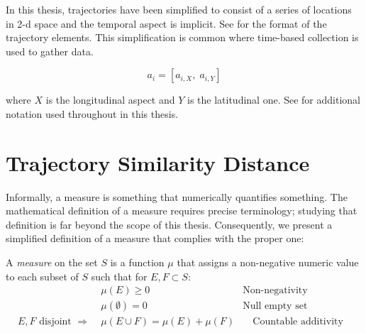 In this thesis, trajectories have been simplified to consist of a series of locations in 2-d space and the temporal aspect is implicit. 
See  for the format of the trajectory elements. This simplification is common where time-based collection is used to gather data. 

\begin{equation}\label{eq:trajectory_elem}
a_i = [ a_{i,X}, \; a_{i, Y} ]
\end{equation}

where $X$ is the longitudinal aspect and $Y$ is the latitudinal one.  See  for additional notation used throughout in this thesis.




\section{Trajectory Similarity Distance}


Informally, a measure is something that numerically quantifies something. 
The mathematical definition of a measure requires precise terminology; studying that definition is far beyond the scope of this thesis.  
Consequently, we present a simplified definition of a measure that complies with the proper one\cite{28-Measure, 29-MeasureMathematics}: 

\medskip
\begin{definition} %
\label{def:measure}  
A \textit{measure} on the set $S$ is a function $\mu$ that assigns a non-negative numeric value to each subset of $S$ such that for  $E, F \subset S$:
\begin{align*}
&\mu(E) \geqslant 0 & \text{Non-negativity}& \\ 
&\mu(\emptyset) = 0 &\text{Null empty set}&  \\
E, F \text{ disjoint } \Rightarrow \; &\mu(E \cup F) = \mu(E) + \mu(F)   &\quad \text{Countable additivity}&  \\
\end{align*}
\end{definition}


